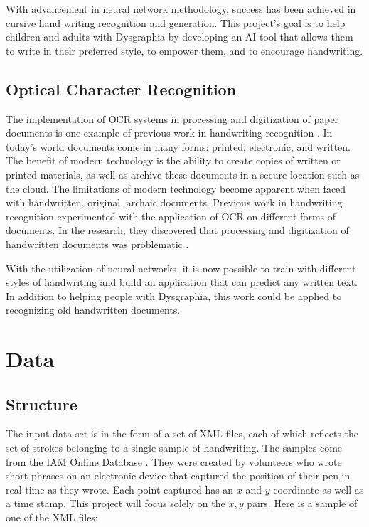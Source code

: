 \documentclass{article}
\begin{document}
With advancement in neural network methodology, success has been achieved in cursive hand writing recognition and generation\cite{previous-work-13}. This project's goal is to help children and adults with Dysgraphia by developing an AI tool that allows them to write in their preferred style, to empower them, and to encourage handwriting.





\subsection{Optical Character Recognition}
 The implementation of OCR systems in processing and digitization of paper documents is one example of previous work in handwriting recognition \cite{Previous-work-0}. In today's world documents come in many forms: printed, electronic, and written. The benefit of modern technology is the ability to create copies of written or printed materials, as well as archive these documents in a secure location such as the cloud. The limitations of modern technology become apparent when faced with handwritten, original, archaic documents. Previous work in handwriting recognition experimented with the application of OCR on different forms of documents. In the research, they discovered that processing and digitization of handwritten documents was problematic \cite{Previous-work-0}.  

With the utilization of neural networks, it is now possible to train with different styles of handwriting and build an application that can predict any written text. In addition to helping people with Dysgraphia, this work could be applied to recognizing old handwritten documents.
\section{Data}
\subsection{Structure}
The input data set is in the form of a set of XML files, each of which reflects the set of strokes belonging to a single sample of handwriting. The samples come from the IAM Online Database \cite{iam}. They were created by volunteers who wrote short phrases on an electronic device that captured the position of their pen in real time as they wrote. Each point captured has an $x$ and $y$ coordinate as well as a time stamp. This project will focus solely on the $x,y$ pairs. Here is a sample of one of the XML files:
\end{document}
